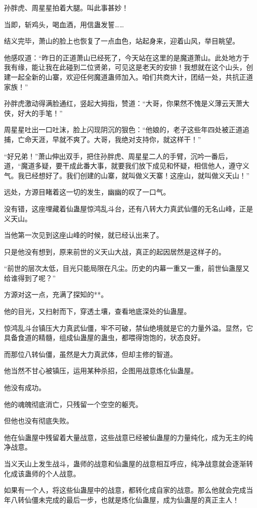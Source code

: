 \begin{this_body}
孙胖虎、周星星拍着大腿。叫此事甚妙！

当即，斩鸡头，喝血酒，用信蛊发誓……

结义完毕，萧山的脸上也恢复了一点血色，站起身来，迎着山风，举目眺望。

他感叹道：“昨日的正道萧山已经死了，今天站在这里的是魔道萧山。此处地方于我有缘，能让我在此碰到二位贤弟，可见这是老天的安排！我想就在这个山头，创建一起全新的山寨，欢迎任何魔道蛊师加入。咱们共商大计，团结一处，共抗正道家族！”

孙胖虎激动得满脸通红，竖起大拇指，赞道：“大哥，你果然不愧是义薄云天萧大侠，好大的手笔！”

周星星吐出一口吐沫，脸上闪现阴沉的狠色：“他娘的，老子这些年四处被正道追捕，亡命天涯，早就不爽了。大哥，我绝对支持你，就这样干！”

“好兄弟！”萧山伸出双手，把住孙胖虎、周星星二人的手臂，沉吟一番后，道，“魔道多疑，要干成此番大事，就要我们放下成见和怀疑，相信他人，遵守义气。我已经想好了。我们创建的山寨，就叫做义天寨！这座山，就叫做义天山！”

远处，方源目睹着这一切的发生，幽幽的叹了一口气。

没有错，这座埋藏着仙蛊屋惊鸿乱斗台，还有八转大力真武仙僵的无名山峰，正是义天山。

当他第一次见到这座山峰的时候，就已经认出来了。

只是他没有想到，原来前世的义天山大战，真正的起因居然是这样子的。

“前世的层次太低，目光只能局限在凡尘。历史的内幕一重又一重，前世仙蛊屋又给谁得到了呢？”

方源对这一点，充满了探知的**。

他的目光，又扫射而下，穿透土壤，查看地底深处的仙蛊屋。

惊鸿乱斗台镇压大力真武仙僵，牢不可破，禁仙绝境就是它的力量外溢。显然，它具备食道的精髓，组成仙蛊屋的蛊虫，都喂得饱饱的，状态良好。

而那位八转仙僵，虽然是大力真武体，但却主修的智道。

他当然不甘心被镇压，运用某种杀招，企图用战意炼化仙蛊屋。

他没有成功。

他的魂魄彻底消亡，只残留一个空空的躯壳。

但他也没有彻底失败。

他在仙蛊屋中残留着大量战意，这些战意已经被仙蛊屋的力量纯化，成为无主的纯净战意。

当义天山上发生战斗，蛊师的战意和仙蛊屋的战意相互呼应，纯净战意就会逐渐转化成该蛊师的个人战意。

如果有一个人，将这些仙蛊屋中的战意，都转化成自家的战意。那么他就会完成当年八转仙僵未完成的最后一步，也就是炼化仙蛊屋，成为仙蛊屋的真正主人！


\end{this_body}

